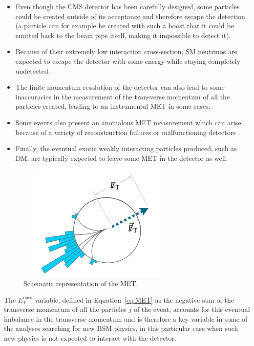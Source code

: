 \documentclass[a4paper, 10pt, openright]{report}
\begin{document}
\begin{itemize}
\item Even though the \ac{CMS} detector has been carefully designed, some particles could be created outside of its acceptance and therefore escape the detection (a particle can for example be created with such a boost that it could be emitted back to the beam pipe itself, making it impossible to detect it).
\item Because of their extremely low interaction cross-section, \ac{SM} neutrinos are expected to escape the detector with some energy while staying completely undetected.
\item The finite momentum resolution of the detector can also lead to some inaccuracies in the measurement of the transverse momentum of all the particles created, leading to an instrumental \ac{MET} in some cases.
\item Some events also present an anomalous \ac{MET} measurement which can arise because of a variety of reconstruction failures or malfunctioning detectors \cite{anomalousMET}.
\item Finally, the eventual exotic weakly interacting particles produced, such as \acf{DM}, are typically expected to leave some \ac{MET} in the detector as well.
\end{itemize}

\begin{figure}[htbp]
\begin{center}
\includegraphics[width=8cm, height=5.8cm]{figs/MET.png}
\caption{Schematic representation of the \ac{MET}.}
\label{fig:MET}
\end{center}
\end{figure}

The $E_{T}^{\text{miss}}$ variable, defined in Equation~\ref{eq:MET} as the negative sum of the transverse momentum of all the particles $j$ of the event, accounts for this eventual imbalance in the transverse momentum and is therefore a key variable in some of the analyses searching for new \ac{BSM} physics, in this particular case when such new physics is not expected to interact with the detector.
\end{document}
